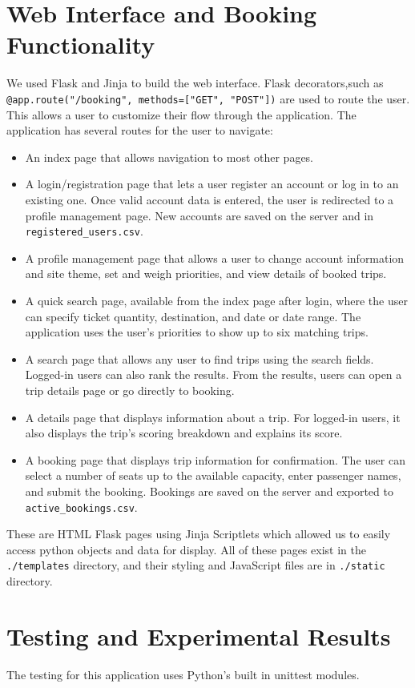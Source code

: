 ﻿\documentclass[11pt]{article}
\begin{document}
\section{Web Interface and Booking Functionality}
We used Flask and Jinja to build the web interface. Flask decorators,such as \texttt{@app.route("/booking", methods=["GET", "POST"])} are used to route the user.
This allows a user to customize their flow through the application.
The application has several routes for the user to navigate:
\begin{itemize}
\item An index page that allows navigation to most other pages.
\item A login/registration page that lets a user register an account or log in to an existing one. Once valid account data is entered, the user is redirected to a profile management page. New accounts are saved on the server and in \texttt{registered\_users.csv}.
\item A profile management page that allows a user to change account information and site theme, set and weigh priorities, and view details of booked trips.
\item A quick search page, available from the index page after login, where the user can specify ticket quantity, destination, and date or date range. The application uses the user's priorities to show up to six matching trips.
\item A search page that allows any user to find trips using the search fields. Logged-in users can also rank the results. From the results, users can open a trip details page or go directly to booking.
\item A details page that displays information about a trip. For logged-in users, it also displays the trip's scoring breakdown and explains its score.
\item A booking page that displays trip information for confirmation. The user can select a number of seats up to the available capacity, enter passenger names, and submit the booking. Bookings are saved on the server and exported to \texttt{active\_bookings.csv}.
\end{itemize}

These are HTML Flask pages using Jinja Scriptlets which allowed us to easily access python objects and data for display.
All of these pages exist in the \texttt{./templates} directory, and their styling and JavaScript files are in \texttt{./static} directory.

\section{Testing and Experimental Results}
The testing for this application uses Python's built in unittest modules.
\end{document}
